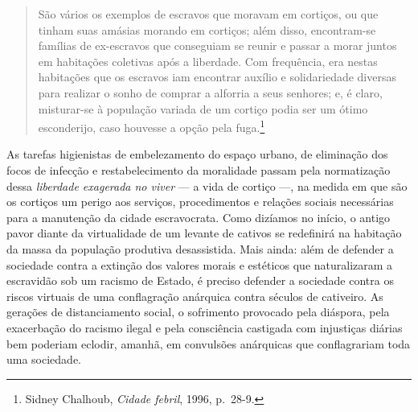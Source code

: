 \begin{quote}
São vários os exemplos de escravos que moravam em cortiços, ou que
tinham suas amásias morando em cortiços; além disso, encontram-se
famílias de ex-escravos que conseguiam se reunir e passar a morar juntos
em habitações coletivas após a liberdade. Com frequência, era nestas
habitações que os escravos iam encontrar auxílio e solidariedade
diversas para realizar o sonho de comprar a alforria a seus senhores; e,
é claro, misturar-se à população variada de um cortiço podia ser um
ótimo esconderijo, caso houvesse a opção pela fuga.\footnote{Sidney
  Chalhoub, \textit{Cidade febril}, 1996, p.~28-9.}
\end{quote}

As tarefas higienistas de embelezamento do espaço urbano, de eliminação
dos focos de infecção e restabelecimento da moralidade passam pela
normatização dessa \textit{liberdade exagerada no viver} --- a vida de
cortiço ---, na medida em que são os cortiços um perigo aos serviços,
procedimentos e relações sociais necessárias para a manutenção da cidade
escravocrata. Como dizíamos no início, o antigo pavor diante da
virtualidade de um levante de cativos se redefinirá na habitação da
massa da população produtiva desassistida. Mais ainda: além de defender
a sociedade contra a extinção dos valores morais e estéticos que
naturalizaram a escravidão sob um racismo de Estado, é preciso defender
a sociedade contra os riscos virtuais de uma conflagração anárquica
contra séculos de cativeiro. As gerações de distanciamento social, o
sofrimento provocado pela diáspora, pela exacerbação do racismo ilegal e
pela consciência castigada com injustiças diárias bem poderiam eclodir,
amanhã, em convulsões anárquicas que conflagrariam toda uma sociedade.

